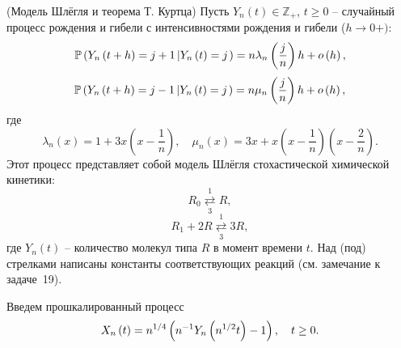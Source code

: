 \begin{problem}(Модель Шлёгля и теорема Т. Куртца)
Пусть $Y_n \left( t 
\right)\in {\mathbb Z}_+ $, $t\ge 0$ -- случайный процесс рождения и гибели с 
интенсивностями рождения и гибели ($h\to 0+)$:
\[
\mathrm{{\mathbb P}}\left( {Y_n \left( {t+h} \right)=j+1\left| {Y_n \left( t \right)=j} 
\right.} \right)=n\lambda _n \left( {\frac{j}{n}} \right)h+o\left( h 
\right),
\]
\[
\mathrm{{\mathbb P}}\left( {Y_n \left( {t+h} \right)=j-1\left| {Y_n \left( t \right)=j} 
\right.} \right)=n\mu _n \left( {\frac{j}{n}} \right)h+o\left( h \right),
\]
где
\[
\lambda _n \left( x \right)=1+3x\left( {x-\frac{1}{n}} \right),
\quad
\mu _n \left( x \right)=3x+x\left( {x-\frac{1}{n}} \right)\left( 
{x-\frac{2}{n}} \right).
\]
Этот процесс 
представляет собой модель Шлёгля стохастической химической кинетики: 
$$R_0 \mathop{\rightleftarrows}\limits_{3}^{1} R,$$ $$R_1 + 2R \mathop{\rightleftarrows}\limits_{3}^{1} 3R,$$ где $Y_n \left( t \right)$ -- количество молекул 
типа $R$ в момент времени $t$. Над (под) стрелками написаны константы 
соответствующих реакций (см. замечание к задаче~19).

Введем прошкалированный процесс
\[
X_n \left( t \right)=n^{1 \mathord{\left/ {\vphantom {1 4}} \right. 
\kern-\nulldelimiterspace} 4}\left( {n^{-1}Y_n \left( {n^{1 \mathord{\left/ 
{\vphantom {1 2}} \right. \kern-\nulldelimiterspace} 2}t} \right)-1} 
\right),
\quad
t\ge 0.
\]


\end{problem}
